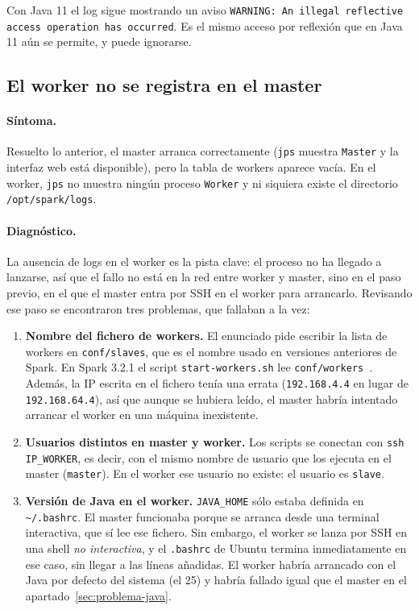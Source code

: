 \documentclass[11pt,a4paper]{article}
\begin{document}
Con Java 11 el log sigue mostrando un aviso \texttt{WARNING: An illegal reflective access operation has occurred}. Es el mismo acceso por reflexión que en Java 11 aún se permite, y puede ignorarse.

\subsection{El worker no se registra en el master}
\label{sec:problema-worker}

\paragraph{Síntoma.} Resuelto lo anterior, el master arranca correctamente (\texttt{jps} muestra \texttt{Master} y la interfaz web está disponible), pero la tabla de workers aparece vacía. En el worker, \texttt{jps} no muestra ningún proceso \texttt{Worker} y ni siquiera existe el directorio \texttt{/opt/spark/logs}.

\paragraph{Diagnóstico.} La ausencia de logs en el worker es la pista clave: el proceso no ha llegado a lanzarse, así que el fallo no está en la red entre worker y master, sino en el paso previo, en el que el master entra por SSH en el worker para arrancarlo. Revisando ese paso se encontraron tres problemas, que fallaban a la vez:

\begin{enumerate}
  \item \textbf{Nombre del fichero de workers.} El enunciado pide escribir la lista de workers en \texttt{conf/slaves}, que es el nombre usado en versiones anteriores de Spark. En Spark 3.2.1 el script \texttt{start-workers.sh} lee \texttt{conf/workers}~\cite{spark-standalone}. Además, la IP escrita en el fichero tenía una errata (\texttt{192.168.4.4} en lugar de \texttt{192.168.64.4}), así que aunque se hubiera leído, el master habría intentado arrancar el worker en una máquina inexistente.

  \item \textbf{Usuarios distintos en master y worker.} Los scripts se conectan con \texttt{ssh IP\_WORKER}, es decir, con el mismo nombre de usuario que los ejecuta en el master (\texttt{master}). En el worker ese usuario no existe: el usuario es \texttt{slave}.

  \item \textbf{Versión de Java en el worker.} \texttt{JAVA\_HOME} sólo estaba definida en \texttt{\textasciitilde/.bashrc}. El master funcionaba porque se arranca desde una terminal interactiva, que sí lee ese fichero. Sin embargo, el worker se lanza por SSH en una shell \emph{no interactiva}, y el \texttt{.bashrc} de Ubuntu termina inmediatamente en ese caso, sin llegar a las líneas añadidas. El worker habría arrancado con el Java por defecto del sistema (el 25) y habría fallado igual que el master en el apartado~\ref{sec:problema-java}.
\end{enumerate}
\end{document}
